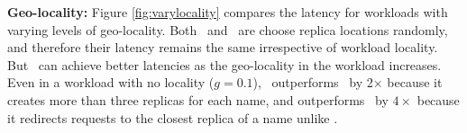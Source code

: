 {%


%
%
%
%
%
%


\textbf{Geo-locality:}  Figure \ref{fig:varylocality} compares the latency for workloads with varying levels of geo-locality.
Both \staticthree\ and \codons\ are choose replica locations randomly, and therefore their latency remains the same irrespective of workload locality. But \auspice\ can achieve better latencies  as the geo-locality in the workload increases. Even in a workload with no locality ($g=0.1$),   \auspice\ outperforms \staticthree\ by 2$\times$ because it creates more than three replicas for each name,  and outperforms \codons\ by $4\times$  because it redirects requests to the closest replica of a name unlike \codons.

}
